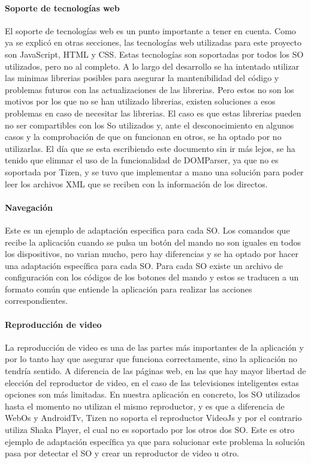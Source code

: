 \paragraph{Soporte de tecnologías web}
El soporte de tecnologías web es un punto importante a tener en cuenta. Como ya se explicó en otras secciones, las
tecnologías web utilizadas para este proyecto son JavaScript, HTML y CSS. Estas tecnologías son soportadas por todos
los SO utilizados, pero no al completo. A lo largo del desarrollo se ha intentado utilizar las minimas librerias posibles
para asegurar la mantenibilidad del código y problemas futuros con las actualizaciones de las librerias. Pero estos no 
son los motivos por los que no se han utilizado librerias, existen soluciones a esos problemas en caso de necesitar las librerias.
El caso es que estas librerias pueden no ser compartibles con los So utilizados y, ante el desconocimiento en algunos casos
y la comprobación de que on funcionan en otros, se ha optado por no utilizarlas. El día que se esta escribiendo este documento sin 
ir más lejos, se ha tenido que elimnar el uso de la funcionalidad de DOMParser, ya que no es soportada por Tizen, y se tuvo
que implementar a mano una solución para poder leer los archivos XML que se reciben con la información de los directos.

\paragraph{Navegación}
Este es un ejemplo de adaptación especifica para cada SO. Los comandos que recibe la aplicación cuando se pulsa un botón
del mando no son iguales en todos los dispositivos, no varian mucho, pero hay diferencias y se ha optado por hacer una
adaptación específica para cada SO. Para cada SO existe un archivo de configuración con los códigos de los botones del mando
y estos se traducen a un formato común que entiende la aplicación para realizar las acciones correspondientes.

\paragraph{Reproducción de video}
La reproducción de video es una de las partes más importantes de la aplicación y por lo tanto hay que asegurar que
funciona correctamente, sino la aplicación no tendría sentido. A diferencia de las páginas web, en las que hay mayor 
libertad de elección del reproductor de video, en el caso de las televisiones inteligentes estas opciones son más limitadas.
En nuestra aplicación en concreto, los SO utilizados hasta el momento no utilizan el mismo reproductor, y es que a diferencia 
de WebOs y AndroidTv, Tizen no soporta el reproductor VideoJs y por el contrario utiliza Shaka Player, el cual no es soportado
por los otros dos SO. Este es otro ejemplo de adaptación específica ya que para solucionar este problema la solución pasa por 
detectar el SO y crear un reproductor de video u otro. 

